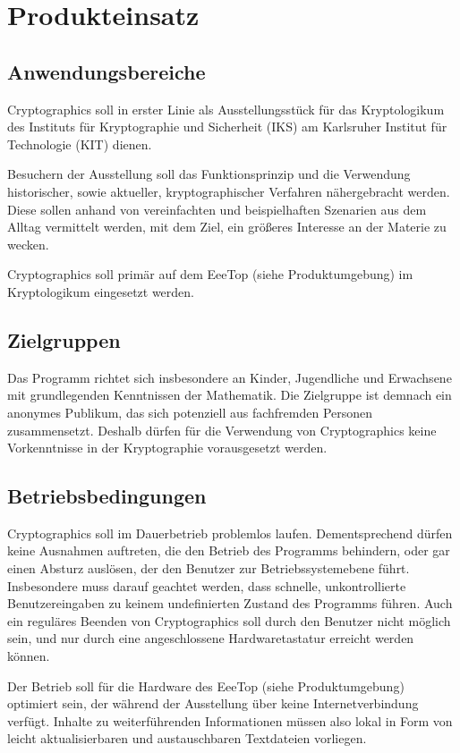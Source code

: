 \documentclass{article}
\begin{document}
\section{Produkteinsatz}
\subsection{Anwendungsbereiche}
\gls{Cryptographics} soll in erster Linie als Ausstellungsstück für das \gls{Kryptologikum} des Instituts für Kryptographie und Sicherheit (\gls{IKS}) am Karlsruher Institut für Technologie (\gls{KIT}) dienen.

Besuchern der Ausstellung soll das Funktionsprinzip und die Verwendung historischer, sowie aktueller, kryptographischer Verfahren nähergebracht werden. Diese sollen anhand von vereinfachten und beispielhaften Szenarien aus dem Alltag vermittelt werden, mit dem Ziel, ein größeres Interesse an der Materie zu wecken.

\gls{Cryptographics} soll primär auf dem \gls{EeeTop} (siehe Produktumgebung) im \gls{Kryptologikum} eingesetzt werden.

\subsection{Zielgruppen}

Das Programm richtet sich insbesondere an Kinder, Jugendliche und Erwachsene mit grundlegenden Kenntnissen der Mathematik. Die Zielgruppe ist demnach ein anonymes Publikum, das sich potenziell aus fachfremden Personen zusammensetzt. Deshalb dürfen für die Verwendung von \gls{Cryptographics} keine Vorkenntnisse in der Kryptographie vorausgesetzt werden.

\subsection{Betriebsbedingungen}

\gls{Cryptographics} soll im Dauerbetrieb problemlos laufen. Dementsprechend dürfen keine Ausnahmen auftreten, die den Betrieb des Programms behindern, oder gar einen Absturz auslösen, der den Benutzer zur Betriebssystemebene führt. Insbesondere muss darauf geachtet werden, dass schnelle, unkontrollierte Benutzereingaben zu keinem undefinierten Zustand des Programms führen. Auch ein reguläres Beenden von \gls{Cryptographics} soll durch den Benutzer nicht möglich sein, und nur durch eine angeschlossene Hardwaretastatur erreicht werden können.

Der Betrieb soll für die Hardware des \gls{EeeTop} (siehe Produktumgebung) optimiert sein, der während der Ausstellung über keine Internetverbindung verfügt. Inhalte zu weiterführenden Informationen müssen also lokal in Form von leicht aktualisierbaren und austauschbaren Textdateien vorliegen.
\end{document}
